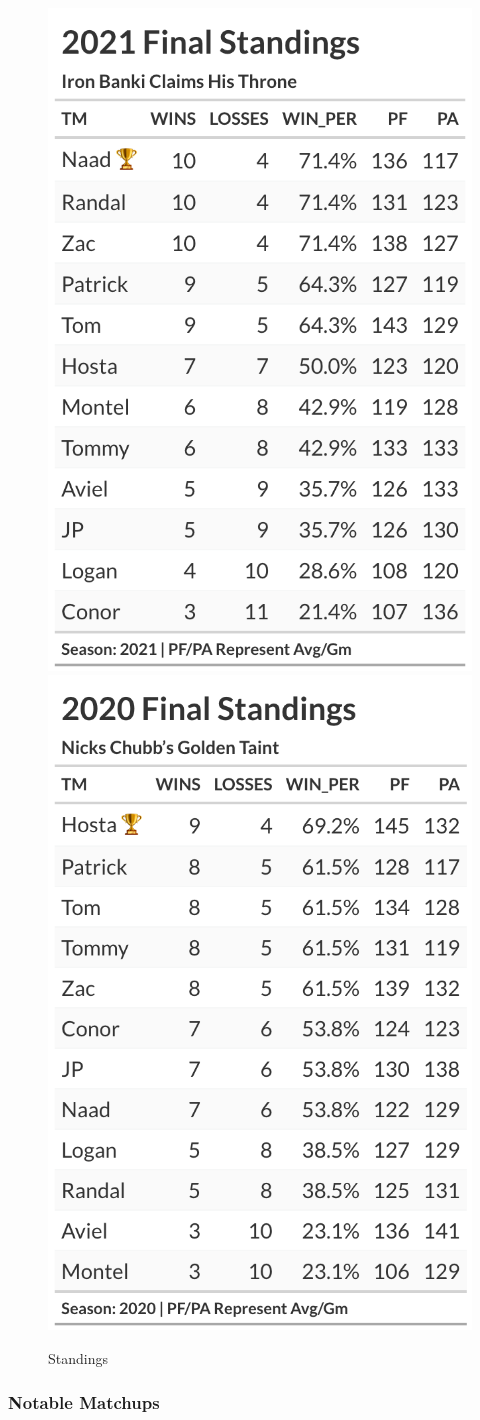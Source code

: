 \documentclass[
]{article}
\begin{document}
\begin{figure}

{\centering \includegraphics[width=0.5\linewidth,height=0.5\textheight]{output/history/2021_standings} \includegraphics[width=0.5\linewidth,height=0.5\textheight]{output/history/2020_standings} 

}

\caption{Standings}\label{fig:unnamed-chunk-3}
\end{figure}
\newpage

\hypertarget{notable-matchups}{%
\subsubsection{Notable Matchups}\label{notable-matchups}}
\end{document}
